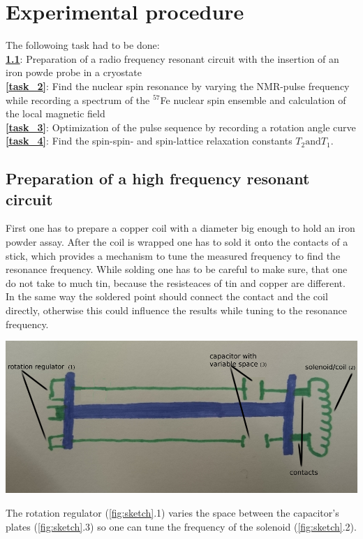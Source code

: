 \section{Experimental procedure}

    The followoing task had to be done:\\
    \textbf{\ref{task_1}}: Preparation of a radio frequency resonant circuit with the insertion of an iron powde probe in a cryostate\\
    \textbf{\ref{task_2}}: Find the nuclear spin resonance by varying the NMR-pulse frequency while recording a spectrum of the $^{57}$Fe nuclear spin ensemble and calculation of the local magnetic field\\
    \textbf{\ref{task_3}}: Optimization of the pulse sequence by recording a rotation angle curve\\
    \textbf{\ref{task_4}}: Find the spin-spin- and spin-lattice relaxation constants $T_2 \text{and} T_1$.   

	\subsection{Preparation of a high frequency resonant circuit}
    \label{task_1}
    First one has to prepare a copper coil with a diameter big enough to hold an iron powder assay. After the coil is wrapped one has to sold it onto the contacts of a stick, which provides a mechanism to tune the measured frequency to find the resonance frequency. While solding one has to be careful to make sure, that one do not take to much tin, because the resisteaces of tin and copper are different. In the same way the soldered point should connect the contact and the coil directly, otherwise this could influence the results while tuning to the resonance frequency.
    \begin{center}
           \includegraphics[scale=0.4]{pic/Skizze_Sonde.png} 
           \label{fig:sketch}
    \end{center}
    The rotation regulator (\ref{fig:sketch}.1) varies the space between the capacitor's plates (\ref{fig:sketch}.3) so one can tune the frequency of the solenoid (\ref{fig:sketch}.2).
